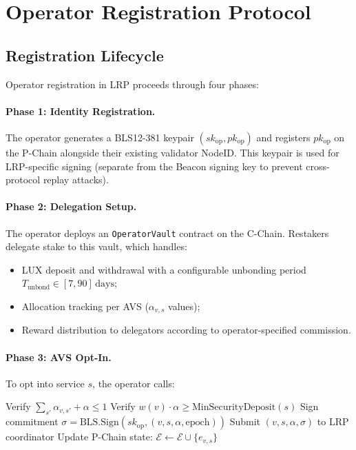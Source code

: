 \section{Operator Registration Protocol}

\label{sec:operators}

\subsection{Registration Lifecycle}

Operator registration in LRP proceeds through four phases:

\paragraph{Phase 1: Identity Registration.}
The operator generates a BLS12-381 keypair $(sk_{\text{op}}, pk_{\text{op}})$ and registers
$pk_{\text{op}}$ on the P-Chain alongside their existing validator NodeID. This keypair is
used for LRP-specific signing (separate from the Beacon signing key to prevent cross-protocol
replay attacks).

\paragraph{Phase 2: Delegation Setup.}
The operator deploys an \texttt{OperatorVault} contract on the C-Chain. Restakers delegate
stake to this vault, which handles:
\begin{itemize}
  \item LUX deposit and withdrawal with a configurable unbonding period
    $T_{\text{unbond}} \in [7, 90]\,\text{days}$;
  \item Allocation tracking per AVS ($\alpha_{v,s}$ values);
  \item Reward distribution to delegators according to operator-specified commission.
\end{itemize}

\paragraph{Phase 3: AVS Opt-In.}
To opt into service $s$, the operator calls:

\begin{algorithmic}
  \State Verify $\sum_{s'} \alpha_{v,s'} + \alpha \leq 1$
  \State Verify $w(v) \cdot \alpha \geq \text{MinSecurityDeposit}(s)$
  \State Sign commitment $\sigma = \text{BLS.Sign}(sk_{\text{op}}, (v, s, \alpha, \text{epoch}))$
  \State Submit $(v, s, \alpha, \sigma)$ to LRP coordinator
  \State Update P-Chain state: $\mathcal{E} \leftarrow \mathcal{E} \cup \{e_{v,s}\}$
\EndFunction
\end{algorithmic}


